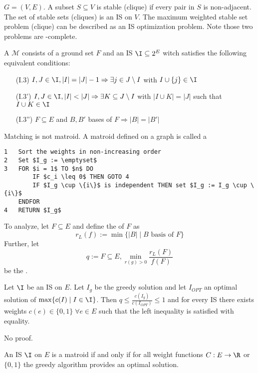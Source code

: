 \begin{xmp+}
$G = (V,E)$. A subset $S \subseteq V$ is stable (clique) if every pair in
$S$ is non-adjacent. The set of stable sets (cliques) is an IS on $V$. The
maximum weighted stable set problem (clique) can be described as an IS
optimization problem. Note those two problems are \npoly-complete.
\end{xmp+}

\begin{defn}\label{def:defn27.4}
A  $\mathcal{M}$ consists of a ground set $F$ and an IS $\I
\subseteq 2^E$ witch satisfies the following equivalent conditions:
\begin{itemize}
\item[(I.3)] $I,J \in \I, |I| = |J|-1 \Rightarrow \exists j \in J\setminus
I$ with $I \cup \{j\} \in \I$
\item[(I.3')] $I,J \in \I, |I| < |J| \Rightarrow \exists K \subseteq J
\setminus I$ with $|I \cup K| = |J|$ such that $I \cup K \in \I$
\item[(I.3'')] $F \subseteq E$ and $B, B'$ bases of $F \Rightarrow |B| =
|B'|$
\end{itemize}
\end{defn}

Matching is not matroid.
A matroid defined on a graph is called a 

\begin{lstlisting}[caption=Greedy algorithm for IS]
1	Sort the weights in non-increasing order
2	Set $I_g := \emptyset$
3	FOR $i = 1$ TO $n$ DO
		IF $c_i \leq 0$ THEN GOTO 4
		IF $I_g \cup \{i\}$ is independent THEN set $I_g := I_g \cup \{i\}$
	ENDFOR
4	RETURN $I_g$
\end{lstlisting}

To analyze, let $F \subseteq E$ and define the  of $F$ as
\[
	r_L(f) := \min \{|B| \mid B \text{ basis of } F\}
\]
Further, let 
\[
	q := F \subseteq E, \min_{r(g) > 0} \frac{r_L(F)}{f(F)}
\]
be the .

\begin{thm}\label{thm:thm27.5}
Let $\I$ be an IS on $E$. Let $I_g$ be the greedy solution and let $I_{OPT}$
an optimal solution of $\max \{ c(I) \mid I \in \I \}$. Then $q \leq
\frac{c(I_g)}{c(I_{OPT})} \leq 1$ and for every IS there exists weights
$c(e) \in \{0, 1\} \;\forall e \in E$ such that the left inequality is
satisfied with equality.
\end{thm}
No proof.

\begin{cor}\label{cor:cor27.6}
An IS $\I$ on $E$ is a matroid if and only if for all weight functions $C: E
\rightarrow \R$ or $\{0,1\}$ the greedy algorithm provides an optimal
solution.
\end{cor}